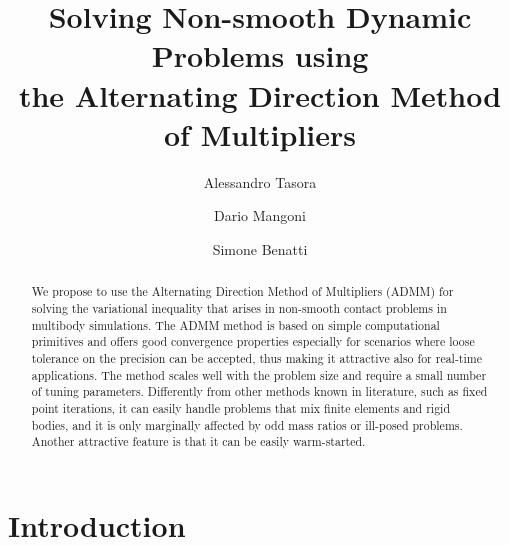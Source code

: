 \documentclass{svproc}
\begin{document}
\mainmatter              %
%
\title{Solving Non-smooth Dynamic Problems using \\ the 
Alternating Direction Method of Multipliers}
%
%
\author{Alessandro Tasora \and Dario Mangoni \and Simone Benatti}
%
%
%

\maketitle              %

\begin{abstract}
We propose to use the Alternating Direction Method of Multipliers (ADMM) for solving the variational inequality that arises in non-smooth contact problems in multibody simulations. The ADMM method is based on simple computational primitives and offers good convergence properties especially for scenarios where loose tolerance on the precision can be accepted, thus making it attractive also for real-time applications. The method scales well with the problem size and require a small number of tuning parameters. Differently from other methods known in literature, such as fixed point iterations, it can easily handle problems that mix finite elements and rigid bodies, and it is only marginally affected by odd mass ratios or ill-posed problems. Another attractive feature is that it can be easily warm-started.
\end{abstract}
%






\section{Introduction}
\end{document}
